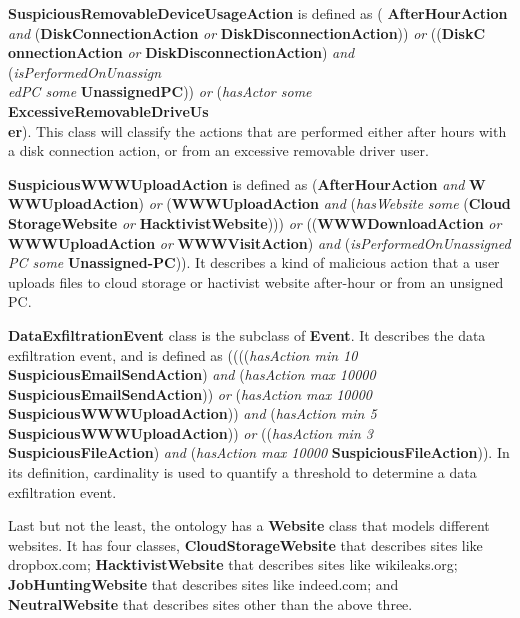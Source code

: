 \textbf{SuspiciousRemovableDeviceUsageAction} is defined as ( \textbf{AfterHourAction} \textit{and} (\textbf{DiskConnectionAction} \textit{or} \textbf{DiskDisconnectionAction})) \textit{or} ((\textbf{DiskC\\onnectionAction} \textit{or} \textbf{DiskDisconnectionAction}) \textit{and} (\textit{isPerformedOnUnassign\\edPC some} \textbf{UnassignedPC})) \textit{or} (\textit{hasActor some} \textbf{ExcessiveRemovableDriveUs\\er}).
This class will classify the actions that are performed either after hours with a disk connection action, or from an excessive removable driver user. 

\textbf{SuspiciousWWWUploadAction} is defined as (\textbf{AfterHourAction} \textit{and} \textbf{W\\WWUploadAction}) \textit{or} (\textbf{WWWUploadAction} \textit{and} (\textit{hasWebsite some} (\textbf{Cloud\\StorageWebsite} \textit{or} \textbf{HacktivistWebsite}))) \textit{or} ((\textbf{WWWDownloadAction} \textit{or} \textbf{WWWUploadAction} \textit{or} \textbf{WWWVisitAction}) \textit{and} (\textit{isPerformedOnUnassigned\\PC some} \textbf{Unassigned-PC})).
It describes a kind of malicious action that a user uploads files to cloud storage or hactivist website after-hour or from an unsigned PC.

\textbf{DataExfiltrationEvent} class is the subclass of \textbf{Event}. 
It describes the data exfiltration event, and is defined as ((((\textit{hasAction min 10} \textbf{SuspiciousEmailSendAction}) \textit{and} (\textit{hasAction max 10000} \textbf{SuspiciousEmailSendAction})) \textit{or} (\textit{hasAction max 10000} \textbf{SuspiciousWWWUploadAction})) \textit{and} (\textit{hasAction min 5} \textbf{SuspiciousWWWUploadAction})) \textit{or} ((\textit{hasAction min 3} \textbf{SuspiciousFileAction}) \textit{and} (\textit{hasAction max 10000} \textbf{SuspiciousFileAction})).
In its definition, cardinality is used to quantify a threshold to determine a data exfiltration event.

Last but not the least, the ontology has a \textbf{Website} class that models different websites. 
It has four classes, \textbf{CloudStorageWebsite} that describes sites like dropbox.com; 
\textbf{HacktivistWebsite} that describes sites like wikileaks.org;
\textbf{JobHuntingWebsite} that describes sites like indeed.com;
and \textbf{NeutralWebsite} that describes sites other than the above three. 

